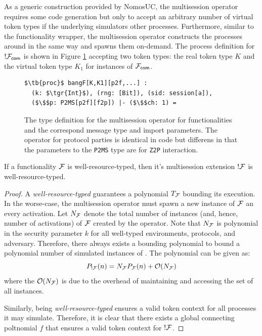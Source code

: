 As a generic construction provided by NomosUC, the multisession operator requires some code generation but only to accept an arbitrary number of virtual token types if the underlying \F simulators other processes. 
Furthermore, similar to the functionality wrapper, the multisession operator constructs the processes around \F in the same way and spawns them on-demand.
The process definition for $!\mathcal{F}_{{\mathsf {com}}}$ is shown in Figure \ref{lst:bangf} accepting two token types: the real token type $K$ and the virtual token type $K_1$ for instances of $\mathcal{F}_{{\mathsf {com}}}$.

\begin{figure}
\begin{lstlisting}[basicstyle=\small\BeraMonottFamily, frame=single, mathescape]
$\tb{proc}$ bangF[K,K1][p2f,...] :
  (k: $\tgr{Int}$), (rng: [Bit]), (sid: session[a]), 
  ($\$$p: P2MS[p2f][f2p]) |- ($\$$ch: 1) =
\end{lstlisting}
\caption{The type definition for the multisession operator for functionalities and the correspond message type and import parameters. The operator for protocol parties is identical in code but differens in that the parameters to the \texttt{P2MS} type are for \texttt{Z2P} interaction.}
\label{lst:bangf}
\end{figure}

\begin{theorem}[PPT !]\label{thm:bangppt}
If a functionality $\mathcal{F}$ is well-resource-typed, then it's multisession extension $!\mathcal{F}$ is well-resource-typed.
\end{theorem}

\begin{proof}
A \textit{well-resource-typed} \F guarantees a polynomial $T_{\mathcal{F}}$ bounding its execution.
In the worse-case, the multisession operator must spawn a new instance of $\mathcal{F}$ an every activation. 
Let $N_{\mathcal{F}}$ denote the total number of instances (and, hence, number of activations) of $\mathcal{F}$ created by the operator.
Note that $N_{\mathcal{F}}$ is polynomial in the security parameter $k$ for all well-typed environments, protocols, and adversary.
Therefore, there always exists a bounding polynomial to bound a polynomial number of simulated instances of \F.
The polynomial can be given as:
$$ P_{!\mathcal{F}}(n) = N_{\mathcal{F}} P_{\mathcal{F}}(n) + \mathcal{O}(N_{\mathcal{F}}) $$
where the $\mathcal{O}(N_{\mathcal{F}})$ is due to the overhead of maintaining and accessing the set of all instances.

Similarly, \F being \textit{well-resource-typed} ensures a valid token context for all processes it may simulate. 
Therefore, it is clear that there exists a global connecting poltnomial $f$ that ensures a valid token context for $!\mathcal{F}$.
\end{proof}


